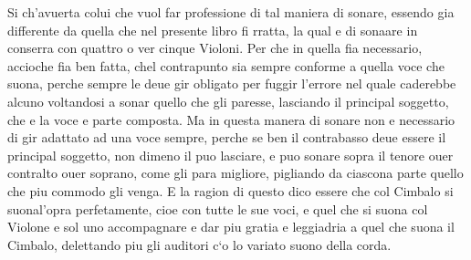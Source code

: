 Si ch'avuerta colui che vuol far professione di tal maniera di sonare, essendo gia differente da quella che nel presente libro fi rratta, la qual e di sonaare in conserra con quattro o ver cinque Violoni. Per che in quella fia necessario, accioche fia ben fatta, chel contrapunto sia sempre conforme a quella voce che suona, perche sempre le deue gir obligato per fuggir l'errore nel quale caderebbe alcuno voltandosi a sonar quello che gli paresse, lasciando il principal soggetto, che e la voce e parte composta. Ma in questa manera di sonare non e necessario di gir adattato ad una voce sempre, perche se ben il contrabasso deue essere il principal soggetto, non dimeno il puo lasciare, e puo sonare sopra il tenore ouer contralto ouer soprano, come gli para migliore, pigliando da ciascona parte quello che piu commodo gli venga. E la ragion di questo dico essere che col Cimbalo si suonal'opra perfetamente, cioe con tutte le sue voci, e quel che si suona col Violone e sol uno accompagnare e dar piu gratia e leggiadria a quel che suona il Cimbalo, delettando piu gli auditori c`o lo variato suono della corda.
